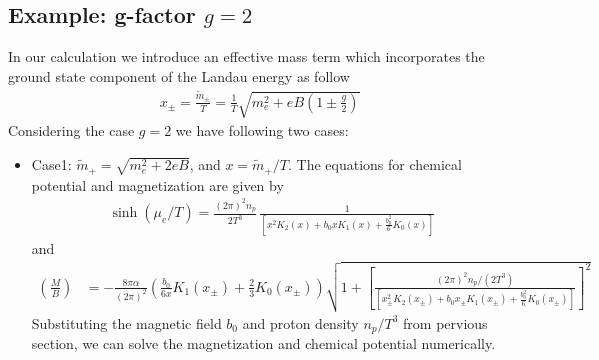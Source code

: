 \documentclass[Universe,article,submit,moreauthors,pdftex]{Definitions/mdpi}
\begin{document}
\subsection{Example: g-factor $g=2$}
In our calculation we introduce an effective mass term which incorporates the ground state component of the Landau energy as follow
\begin{align}
x_\pm=\frac{\tilde{m}_\pm}{T}=\frac{1}{T}\sqrt{m^2_e+eB\left(1\pm\frac{g}{2}\right)}
\end{align}
Considering the case $g=2$ we have following two cases:
\begin{itemize}
  \item Case1: $\tilde m_+=\sqrt{m^2_e+2eB}$, and $x=\tilde m_+/T$. The equations for chemical potential and magnetization are given by
  \begin{align}\label{chemical_001}
 \sinh{(\mu_e/T)}=\frac{(2\pi)^2n_p}{2T^3}\,\frac{1}{\left[x^2K_2(x)+b_0x K_1(x)+\frac{b^2_0}{6}K_0(x)\right]}
  \end{align}
  and
  \begin{align}\label{Magnetization_001}
 \left(\frac{M}{B}\right)&=-\frac{8\pi\alpha}{(2\pi)^2}\left(\frac{b_0}{6x}K_1(x_\pm)+\frac{2}{3}K_0(x_\pm)\right)\sqrt{1+\left[\frac{{(2\pi)^2n_p}/{(2T^3)}}{\left[x_\pm^2K_2(x_\pm)+b_0x_\pm K_1(x_\pm)+\frac{b^2_0}{6}K_0(x_\pm)\right]}\right]^2}
   \end{align}
Substituting the magnetic field $b_0$ and proton density $n_p/T^3$ from pervious section, we can solve the magnetization and chemical potential numerically. 


\end{itemize}
\end{document}
